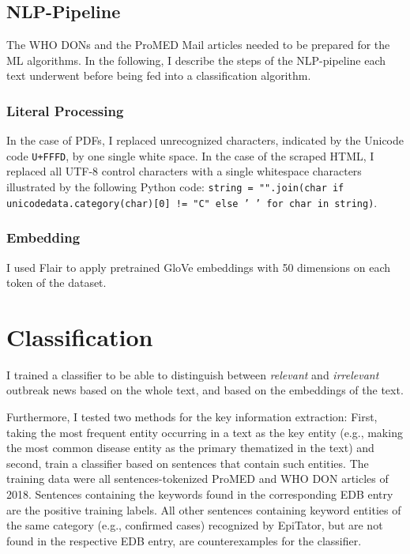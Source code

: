 \subsection{NLP-Pipeline}
  The WHO DONs and the ProMED Mail articles needed to be prepared for the ML algorithms.
  In the following, I describe the steps of the NLP-pipeline each text underwent before being fed into a classification algorithm.

\subsubsection{Literal Processing}
  In the case of PDFs, I replaced unrecognized characters, indicated by the Unicode code \texttt{U+FFFD}, by one single white space.
  In the case of the scraped HTML, I replaced all UTF-8 control characters with a single whitespace characters illustrated by the following Python code: \texttt{string = "".join(char if unicodedata.category(char)[0] != "C" else ' ' for char in string)}.

\subsubsection{Embedding}
  I used Flair to apply pretrained GloVe embeddings with 50 dimensions on each token of the dataset.

\section{Classification}
  I trained a classifier to be able to distinguish between \textsl{relevant} and \textsl{irrelevant} outbreak news based on the whole text, and based on the embeddings of the text.

  Furthermore, I tested two methods for the key information extraction: First, taking the most frequent entity occurring in a text as the key entity (e.g., making the most common disease entity as the primary thematized in the text) and second, train a classifier based on sentences that contain such entities.
  The training data were all sentences-tokenized ProMED and WHO DON articles of 2018.
  Sentences containing the keywords found in the corresponding EDB entry are the positive training labels.
  All other sentences containing keyword entities of the same category (e.g., confirmed cases) recognized by EpiTator, but are not found in the respective EDB entry, are counterexamples for the classifier.

